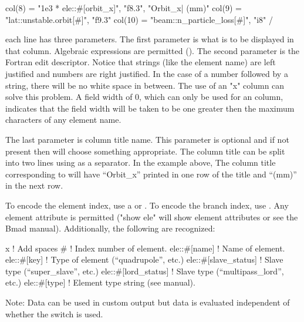 {{{{{{{{{\begin{description}
\begin{example}
    col(8)  = "1e3 * ele::#[orbit_x]",  "f8.3", "Orbit_x| (mm)" 
    col(9)  = "lat::unstable.orbit[#]", "f9.3"
    col(10) = "beam::n_particle_loss[#]", "i8"
  /
\end{example}
each  line has three parameters. The first parameter is what is to be displayed in that
column. Algebraic expressions are permitted (). The second parameter is the
Fortran edit descriptor. Notice that strings (like the element name) are left justified and numbers
are right justified. In the case of a number followed by a string, there will be no white space in
between. The use of an "x" column can solve this problem. A field width of 0, which can only be used
for an  column, indicates that the field width will be taken to be one greater
then the maximum characters of any element name.

The last parameter is column title name. This parameter is optional and if not present then \tao
will choose something appropriate. The column title can be split into two lines using  as a
separator.  In the example above, The column title corresponding to  will have
``Orbit_x'' printed in one row of the title and ``(mm)'' in the next row.

To encode the element index, use a \vn{\#} or . To encode the branch index, use
. Any element attribute is permitted ("show ele" will show element attributes or see
the Bmad manual). Additionally, the following are recognized:
\begin{example}
  x                           ! Add spaces
  #                           ! Index number of element.
  ele::#[name]                ! Name of element.
  ele::#[key]                 ! Type of element (``quadrupole'', etc.)
  ele::#[slave_status]        ! Slave type (``super_slave'', etc.)
  ele::#[lord_status]         ! Slave type (``multipass_lord'', etc.)
  ele::#[type]                ! Element type string (see \bmad manual).
\end{example}

Note: Data can be used in custom output but data is evaluated independent of whether the
 switch is used.


\end{description}}}}}}}}}}
